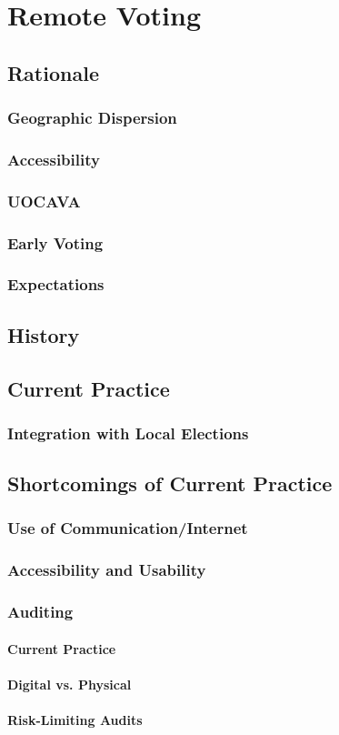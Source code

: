 \chapter{Remote Voting}
\label{chapter:remote_voting}

\section{Rationale}
\subsection{Geographic Dispersion}
\subsection{Accessibility}
\subsection{UOCAVA}
\subsection{Early Voting}
\subsection{Expectations}
\section{History}
\section{Current Practice}
\subsection{Integration with Local Elections}
\section{Shortcomings of Current Practice}
\subsection{Use of Communication/Internet}
\subsection{Accessibility and Usability}
\subsection{Auditing}
\subsubsection{Current Practice}
\subsubsection{Digital vs. Physical}
\subsubsection{Risk-Limiting Audits}
